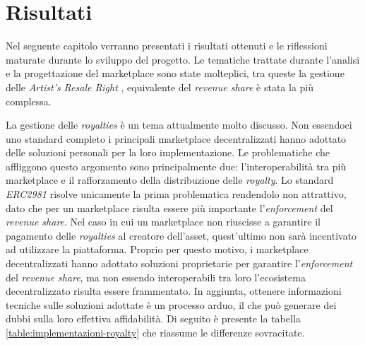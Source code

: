 \chapter{Risultati}
\label{sec:risultati}

Nel seguente capitolo verranno presentati i risultati ottenuti e le riflessioni maturate durante lo sviluppo del progetto. Le tematiche trattate durante l'analisi e la progettazione del marketplace sono state molteplici, tra queste la gestione delle \textit{Artist's Resale Right} \cite{resale-right}, equivalente del \textit{revenue share} è stata la più complessa. 

La gestione delle \textit{royalties} è un tema attualmente molto discusso. Non essendoci uno standard completo i principali marketplace decentralizzati hanno adottato delle soluzioni personali per la loro implementazione. Le problematiche che affliggono questo argomento sono principalmente due: l'interoperabilità tra più marketplace e il rafforzamento della distribuzione delle \textit{royalty}. Lo standard \textit{ERC2981} risolve unicamente la prima problematica rendendolo non attrattivo, dato che per un marketplace risulta essere più importante l'\textit{enforcement} del \textit{revenue share}. Nel caso in cui un marketplace non riuscisse a garantire il pagamento delle \textit{royalties} al creatore dell'asset, quest'ultimo non sarà incentivato ad utilizzare la piattaforma. Proprio per questo motivo, i marketplace decentralizzati hanno adottato soluzioni proprietarie per garantire l'\textit{enforcement} del \textit{revenue share}, ma non essendo interoperabili tra loro l'ecosistema decentralizzato risulta essere frammentato. In aggiunta, ottenere informazioni tecniche sulle soluzioni adottate è un processo arduo, il che può generare dei dubbi sulla loro effettiva affidabilità. Di seguito è presente la tabella \ref{table:implementazioni-royalty} che riassume le differenze sovracitate.


